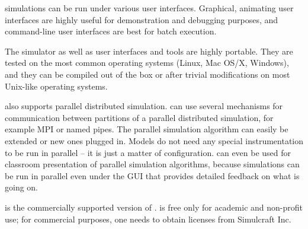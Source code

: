 {\opp} simulations can be run under various user interfaces.
Graphical, animating user interfaces are highly useful for
demonstration and debugging purposes, and command-line user
interfaces are best for batch execution.

The simulator as well as user interfaces and tools are highly portable.
They are tested on the most common operating systems (Linux, Mac OS/X,
Windows), and they can be compiled out of the box or after trivial
modifications on most Unix-like operating systems.

{\opp} also supports parallel distributed simulation. {\opp} can
use several mechanisms for communication between partitions of
a parallel distributed simulation, for example MPI or named pipes.
The parallel simulation algorithm can easily be extended or new
ones plugged in. Models do not need any special instrumentation
to be run in parallel -- it is just a matter of configuration.
{\opp} can even be used for classroom presentation of parallel
simulation algorithms, because simulations can be run in parallel
even under the GUI that provides detailed feedback on what is going on.

{\omnest} is the commercially supported version of {\omnetpp}.
{\omnetpp} is free only for academic and non-profit use;
for commercial purposes, one needs to obtain {\omnest} licenses
from Simulcraft Inc.


